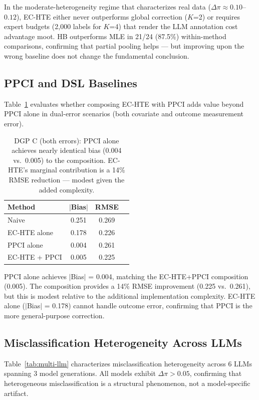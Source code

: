 \documentclass[11pt]{article}
\begin{document}
In the moderate-heterogeneity regime that characterizes real data ($\Delta\pi \approx 0.10$--$0.12$), EC-HTE either never outperforms global correction ($K$=2) or requires expert budgets (2{,}000 labels for $K$=4) that render the LLM annotation cost advantage moot.
HB outperforms MLE in 21/24 (87.5\%) within-method comparisons, confirming that partial pooling helps --- but improving upon the wrong baseline does not change the fundamental conclusion.

\subsection{PPCI and DSL Baselines}
\label{sec:ppci}

Table~\ref{tab:ppci} evaluates whether composing EC-HTE with PPCI adds value beyond PPCI alone in dual-error scenarios (both covariate and outcome measurement error).

\begin{table}[t]
\centering
\small
\begin{tabular}{lccc}
\toprule
Method & $|$Bias$|$ & RMSE \\
\midrule
Naive & 0.251 & 0.269 \\
EC-HTE alone & 0.178 & 0.226 \\
PPCI alone & 0.004 & 0.261 \\
EC-HTE + PPCI & 0.005 & 0.225 \\
\bottomrule
\end{tabular}
\caption{DGP C (both errors): PPCI alone achieves nearly identical bias (0.004 vs.\ 0.005) to the composition. EC-HTE's marginal contribution is a 14\% RMSE reduction --- modest given the added complexity.}
\label{tab:ppci}
\end{table}

PPCI alone achieves $|$Bias$|$ = 0.004, matching the EC-HTE+PPCI composition (0.005).
The composition provides a 14\% RMSE improvement (0.225 vs.\ 0.261), but this is modest relative to the additional implementation complexity.
EC-HTE alone ($|$Bias$|$ = 0.178) cannot handle outcome error, confirming that PPCI is the more general-purpose correction.

\subsection{Misclassification Heterogeneity Across LLMs}
\label{sec:multi-llm}

Table~\ref{tab:multi-llm} characterizes misclassification heterogeneity across 6 LLMs spanning 3 model generations.
All models exhibit $\Delta\pi > 0.05$, confirming that heterogeneous misclassification is a structural phenomenon, not a model-specific artifact.
\end{document}
